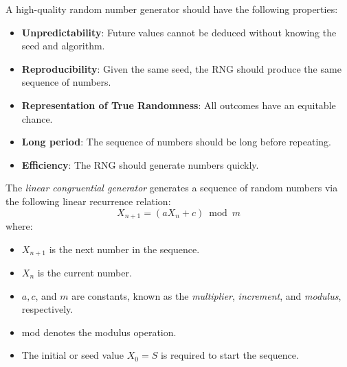 \documentclass[10pt, headings=standardclasses, parskip=half, twoside]{scrartcl}
\begin{document}
A high-quality random number generator should have the following properties:
    \begin{itemize}[before={\parskip=0pt}, nosep]
        \item \textbf{Unpredictability}: Future values cannot be deduced without knowing the seed and algorithm.
        \item \textbf{Reproducibility}: Given the same seed, the RNG should produce the same sequence of numbers.
        \item \textbf{Representation of True Randomness}: All outcomes have an equitable chance.
        \item \textbf{Long period}: The sequence of numbers should be long before repeating.
        \item \textbf{Efficiency}: The RNG should generate numbers quickly.
    \end{itemize}

\begin{example}
    The \textit{linear congruential generator} generates a sequence of random numbers via the following linear recurrence relation:
    \[
    X_{n+1}=\left(a X_{n}+c\right) \bmod m
    \]
    where:
    \begin{itemize}[before={\parskip=0pt}, nosep]
        \item $X_{n+1}$ is the next number in the sequence.
        \item $X_{n}$ is the current number.
        \item $a, c$, and $m$ are constants, known as the \textit{multiplier}, \textit{increment}, and \textit{modulus}, respectively.
        \item mod denotes the modulus operation.
        \item The initial or seed value $X_{0}=S$ is required to start the sequence. \qedhere
    \end{itemize}
\end{example}
\end{document}
